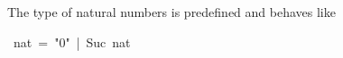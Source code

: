 \begin{isabelle}%
%
\begin{isamarkuptext}%
\noindent
The type  of natural
numbers is predefined and behaves like%
\end{isamarkuptext}%
~nat~=~{"}0{"}~|~Suc~nat\end{isabelle}%

